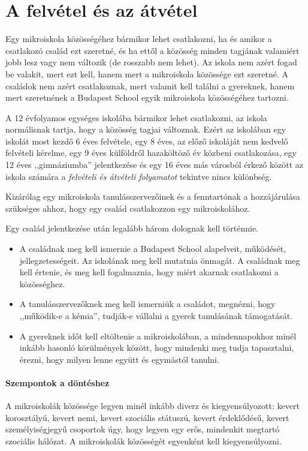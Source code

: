 \section{A felvétel és az átvétel}
\label{sec:felvetel-atvetel}
Egy mikroiskola közösségéhez bármikor lehet csatlakozni, ha és amikor a
csatlakozó
család ezt szeretné, és ha ettől a közösség minden tagjának valamiért  jobb
lesz vagy nem változik (de rosszabb nem lehet).
Az iskola nem azért fogad be valakit, mert
ezt kell, hanem mert a mikroiskola közössége ezt szeretné.
A családok nem azért csatlakoznak, mert valamit kell találni a gyereknek, hanem
mert
szeretnének a Budapest School egyik mikroiskola közösségéhez tartozni.

A 12 évfolyamos egységes iskolába bármikor lehet csatlakozni, az iskola
normálisnak tartja, hogy a közösség tagjai változnak.
Ezért az iskolában egy iskolát most kezdő 6 éves felvétele, egy 8 éves, az előző
iskoláját nem kedvelő felvételi kérelme, egy 9 éves
külföldről hazaköltöző év közbeni csatlakozása, egy 12 éves ,,gimnáziumba''
jelentkezése és egy 16 éves más városból érkező  között az iskola
számára
a \emph{felvételi és átvételi folyamatot} tekintve nincs különbség.

Kizárólag egy mikroiskola tanulásszervezőinek és a fenntartónak
a\linebreak
hozzájárulása
szükséges ahhoz, hogy
egy család csatlakozzon egy mikroiskolához.

Egy család jelentkezése után legalább három dolognak kell történnie.
\begin{itemize}
      \item A családnak meg kell ismernie a Budapest School alapelveit,
            működését, jellegzetességeit. Az iskolának meg kell mutatnia
            önmagát. A
            családnak meg kell értenie,  és meg kell fogalmaznia, hogy miért
            akarnak
            csatlakozni a közösséghez.
      \item A tanulásszervezőknek meg kell ismerniük a családot, megnézni, hogy
            ,,működik-e a kémia'', tudják-e vállalni a gyerek tanulásának
            támogatását.
      \item A gyereknek időt kell eltöltenie a mikroiskolában, a mindennapokhoz
            minél inkább hasonló körülmények között, hogy mindenki meg tudja
            tapasztalni,
            érezni, hogy milyen lenne együtt és egymástól tanulni.
\end{itemize}

\paragraph{Szempontok a döntéshez}
A mikroiskolák közössége legyen minél inkább diverz és kiegyensúlyozott: kevert
korosztályú, kevert nemi, kevert szociális státuszú, kevert
érdeklődésű, kevert személyiségjegyű csoportok úgy, hogy legyen egy erős,
mindenkit megtartó szociális
hálózat. A mikroiskolák közösségét egyenként kell kiegyensúlyozni.%

